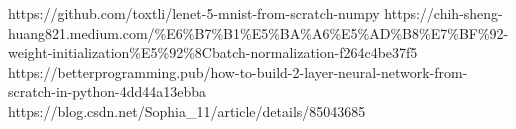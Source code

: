 \documentclass[conference]{IEEEtran}
\begin{document}


\begin{thebibliography}{00}
 https://github.com/toxtli/lenet-5-mnist-from-scratch-numpy
 https://chih-sheng-huang821.medium.com/\%E6\%B7\%B1\%E5\%BA\%A6\%E5\%AD\%B8\%E7\%BF\%92-weight-initialization\%E5\%92\%8Cbatch-normalization-f264c4be37f5
 https://betterprogramming.pub/how-to-build-2-layer-neural-network-from-scratch-in-python-4dd44a13ebba
 https://blog.csdn.net/Sophia\_11/article/details/85043685
\end{thebibliography}
\end{document}
